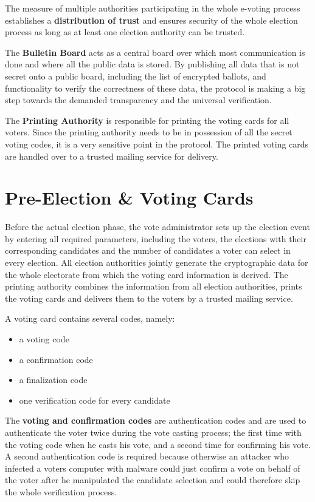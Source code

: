 The measure of multiple authorities participating in the whole e-voting process establishes a \textbf{distribution of trust} and ensures security of the whole election process as long as at least one election authority can be trusted.

The \textbf{Bulletin Board} acts as a central board over which most communication is done and where all the public data is stored. By publishing all data that is not secret onto a public board, including the list of encrypted ballots, and functionality to verify the correctness of these data, the protocol is making a big step towards the demanded transparency and the universal verification.

The \textbf{Printing Authority} is responsible for printing the voting cards for all voters. Since the printing authority needs to be in possession of all the secret voting codes, it is a very sensitive point in the protocol. The printed voting cards are handled over to a trusted mailing service for delivery.

\section{Pre-Election \& Voting Cards}
Before the actual election phase, the vote administrator sets up the election event by entering all required parameters, including the voters, the elections with their corresponding candidates and the number of candidates a voter can select in every election. All election authorities jointly generate the cryptographic data for the whole electorate from which the voting card information is derived. The printing authority combines the information from all election authorities, prints the voting cards and delivers them to the voters by a trusted mailing service. 

A voting card contains several codes, namely:

\begin{itemize}
	\item a voting code
	\item a confirmation code
	\item a finalization code
	\item one verification code for every candidate
\end{itemize}

The \textbf{voting and confirmation codes} are authentication codes and are used to authenticate the voter twice during the vote casting process; the first time with the voting code when he casts his vote, and a second time for confirming his vote. A second authentication code is required because otherwise an attacker who infected a voters computer with malware could just confirm a vote on behalf of the voter after he manipulated the candidate selection and could therefore skip the whole verification process.


